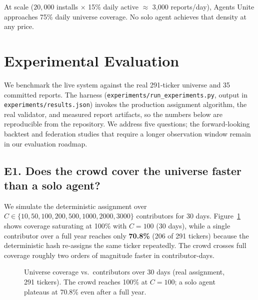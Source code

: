 \documentclass[10pt,twocolumn]{article}
\begin{document}
At scale ($20{,}000$ installs $\times$ 15\% daily active $\approx$ 3{,}000 reports/day), Agents Unite approaches 75\% daily universe coverage. No solo agent achieves that density at any price.

\section{Experimental Evaluation}
\label{sec:experiments}

We benchmark the live system against the real 291-ticker universe and 35 committed reports. The harness (\texttt{experiments/run\_experiments.py}, output in \texttt{experiments/results.json}) invokes the production assignment algorithm, the real validator, and measured report artifacts, so the numbers below are reproducible from the repository. We address five questions; the forward-looking backtest and federation studies that require a longer observation window remain in our evaluation roadmap.

\subsection{E1. Does the crowd cover the universe faster than a solo agent?}

We simulate the deterministic assignment over $C \in \{10,50,100,200,500,1000,2000,3000\}$ contributors for 30 days. Figure~\ref{fig:coverage} shows coverage saturating at 100\% with $C=100$ (30 days), while a single contributor over a full year reaches only \textbf{70.8\%} (206 of 291 tickers) because the deterministic hash re-assigns the same ticker repeatedly. The crowd crosses full coverage roughly two orders of magnitude faster in contributor-days.

\begin{figure}[h]
\centering
{}
\caption{Universe coverage vs.\ contributors over 30 days (real assignment, 291 tickers). The crowd reaches 100\% at $C{=}100$; a solo agent plateaus at 70.8\% even after a full year.}
\label{fig:coverage}
\end{figure}
\end{document}
